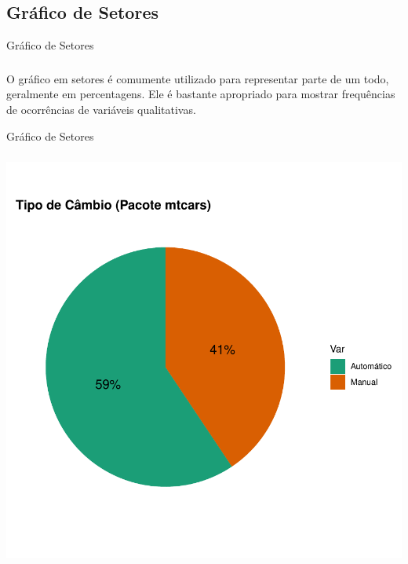 \documentclass[14pt,aspectratio=1610]{beamer}
\begin{document}
\subsection{Gráfico de Setores}
\begin{frame}{Gráfico de Setores}
\frametitle{}
\begin{block}{}
\justifying
O gráfico em setores é comumente utilizado para representar parte de um todo, geralmente em percentagens. Ele é bastante apropriado para mostrar frequências de ocorrências de variáveis qualitativas.
\end{block}
\end{frame}

\begin{frame}{Gráfico de Setores}
\frametitle{}
\begin{block}{}
\begin{center}
\includegraphics{Aula4-pie1}
\end{center}
\end{block}
\end{frame}
\end{document}
